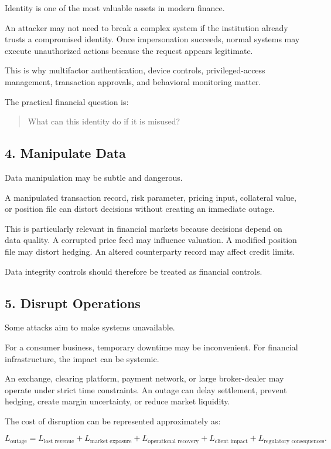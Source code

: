 Identity is one of the most valuable assets in modern finance.

An attacker may not need to break a complex system if the institution already trusts a compromised identity. Once impersonation succeeds, normal systems may execute unauthorized actions because the request appears legitimate.

This is why multifactor authentication, device controls, privileged-access management, transaction approvals, and behavioral monitoring matter.

The practical financial question is:

\begin{quote}
What can this identity do if it is misused?
\end{quote}

\subsection{4. Manipulate Data}

Data manipulation may be subtle and dangerous.

A manipulated transaction record, risk parameter, pricing input, collateral value, or position file can distort decisions without creating an immediate outage.

This is particularly relevant in financial markets because decisions depend on data quality. A corrupted price feed may influence valuation. A modified position file may distort hedging. An altered counterparty record may affect credit limits.

Data integrity controls should therefore be treated as financial controls.

\subsection{5. Disrupt Operations}

Some attacks aim to make systems unavailable.

For a consumer business, temporary downtime may be inconvenient. For financial infrastructure, the impact can be systemic.

An exchange, clearing platform, payment network, or large broker-dealer may operate under strict time constraints. An outage can delay settlement, prevent hedging, create margin uncertainty, or reduce market liquidity.

The cost of disruption can be represented approximately as:

\begin{equation}
L_{\text{outage}}
=
L_{\text{lost revenue}}
+
L_{\text{market exposure}}
+
L_{\text{operational recovery}}
+
L_{\text{client impact}}
+
L_{\text{regulatory consequences}}.
\end{equation}

